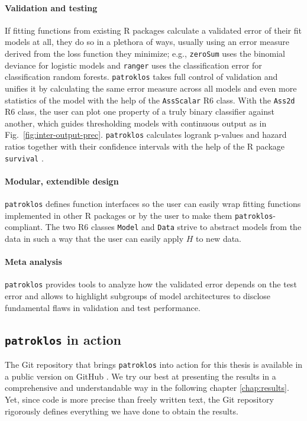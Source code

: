 \paragraph{Validation and testing} 
If fitting functions from existing R packages calculate a validated error of 
their fit models at all, they do so in a plethora of ways, usually using an error measure derived 
from the loss function they minimize; e.g., \texttt{zeroSum} uses the binomial deviance for 
logistic models and \texttt{ranger} uses the classification error for classification random 
forests. \texttt{patroklos} takes 
full control of validation and unifies it
by calculating the same error measure across all models and even more statistics of the model
with the help of the \texttt{AssScalar} R6 class. With the \texttt{Ass2d} R6 class, the 
user can plot one property of a truly binary classifier against another, which guides 
thresholding models with continuous output as in Fig.\ \ref{fig:inter-output-prec}. 
\texttt{patroklos} calculates logrank p-values and hazard ratios together with their confidence
intervals with the help of the R package \texttt{survival} \cite{survival-cran}.

\paragraph{Modular, extendible design} 
\texttt{patroklos} defines function interfaces so the user 
can easily wrap fitting functions implemented in other R packages or by the user to make 
them \texttt{patroklos}-compliant. The two R6 classes \texttt{Model} and \texttt{Data}
strive to abstract models from the data in such a way that the user can easily apply $H$ to new 
data.

\paragraph{Meta analysis} 
\texttt{patroklos} provides tools to analyze how the validated error depends on the test error and 
allows to highlight subgroups of model architectures to disclose fundamental flaws in validation 
and test performance.

\subsection{\texttt{patroklos} in action}

The Git repository that brings \texttt{patroklos} into action for this thesis is available in a 
public version on GitHub \cite{thesis-gh}. We try our best at presenting the results in a 
comprehensive and understandable way in the following chapter \ref{chap:results}. Yet, since code 
is more precise than freely written text, the Git repository rigorously defines everything we have 
done to obtain the results.

